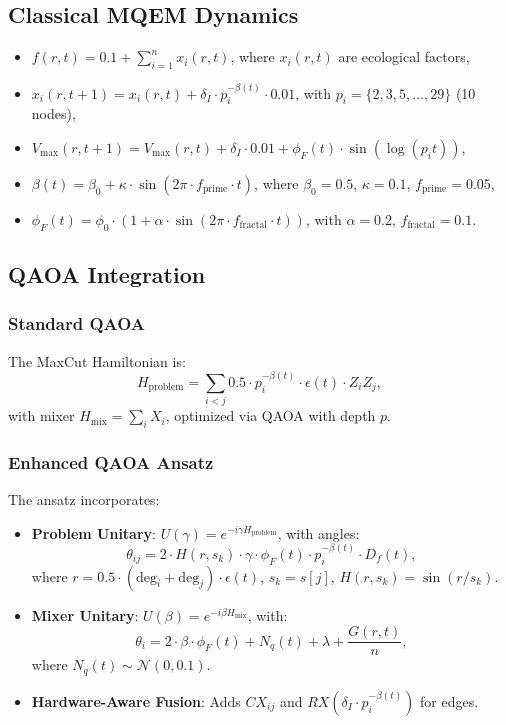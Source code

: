\documentclass{article}
\theoremstyle{plain}
\begin{document}
\subsection{Classical MQEM Dynamics}
\begin{itemize}
    \item \( f(r,t) = 0.1 + \sum_{i=1}^{n} x_i(r,t) \), where \( x_i(r,t) \) are ecological factors,
    \item \( x_i(r,t+1) = x_i(r,t) + \delta_I \cdot p_i^{-\beta(t)} \cdot 0.01 \), with \( p_i = \{2, 3, 5, \ldots, 29\} \) (10 nodes),
    \item \( V_{\text{max}}(r,t+1) = V_{\text{max}}(r,t) + \delta_I \cdot 0.01 + \phi_F(t) \cdot \sin(\log(p_i t)) \),
    \item \( \beta(t) = \beta_0 + \kappa \cdot \sin(2\pi \cdot f_{\text{prime}} \cdot t) \), where \(\beta_0 = 0.5\), \(\kappa = 0.1\), \(f_{\text{prime}} = 0.05\),
    \item \( \phi_F(t) = \phi_0 \cdot (1 + \alpha \cdot \sin(2\pi \cdot f_{\text{fractal}} \cdot t)) \), with \(\alpha = 0.2\), \(f_{\text{fractal}} = 0.1\).
\end{itemize}

\subsection{QAOA Integration}
\subsubsection{Standard QAOA}
The MaxCut Hamiltonian is:
\begin{equation}
H_{\text{problem}} = \sum_{i < j} 0.5 \cdot p_i^{-\beta(t)} \cdot \epsilon(t) \cdot Z_i Z_j,
\end{equation}
with mixer \( H_{\text{mix}} = \sum_i X_i \), optimized via QAOA with depth \( p \).

\subsubsection{Enhanced QAOA Ansatz}
The ansatz incorporates:
\begin{itemize}
    \item \textbf{Problem Unitary}: \( U(\gamma) = e^{-i \gamma H_{\text{problem}}} \), with angles:
    \[
    \theta_{ij} = 2 \cdot H(r, s_k) \cdot \gamma \cdot \phi_F(t) \cdot p_i^{-\beta(t)} \cdot D_f(t),
    \]
    where \( r = 0.5 \cdot (\text{deg}_i + \text{deg}_j) \cdot \epsilon(t) \), \( s_k = s[j] \), \( H(r, s_k) = \sin(r / s_k) \).
    \item \textbf{Mixer Unitary}: \( U(\beta) = e^{-i \beta H_{\text{mix}}} \), with:
    \[
    \theta_i = 2 \cdot \beta \cdot \phi_F(t) + N_q(t) + \lambda + \frac{G(r,t)}{n},
    \]
    where \( N_q(t) \sim \mathcal{N}(0, 0.1) \).
    \item \textbf{Hardware-Aware Fusion}: Adds \( CX_{ij} \) and \( RX(\delta_I \cdot p_i^{-\beta(t)}) \) for edges.
\end{itemize}
\end{document}
